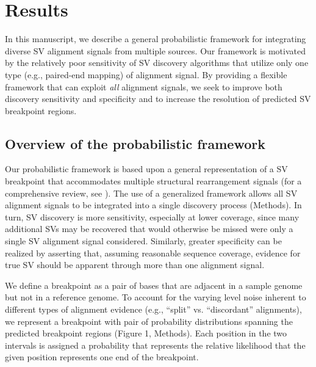 \documentclass[11pt]{article}
\begin{document}
\section{Results}

In this manuscript, we describe a general probabilistic framework for 
integrating diverse SV alignment signals from multiple sources. Our framework is
motivated by the relatively poor sensitivity of SV discovery algorithms
that utilize only one type (e.g., paired-end mapping) of alignment signal.
By providing a flexible framework that can exploit \emph{all} alignment signals,
we seek to improve both discovery sensitivity and specificity and to increase 
the resolution of predicted SV breakpoint regions.

\subsection{Overview of the probabilistic framework}

Our probabilistic framework is based upon a general representation of a SV 
breakpoint that accommodates multiple structural rearrangement signals (for a 
comprehensive review, see \cite{Alkan2011}). The use of a generalized framework
allows all SV alignment signals to be integrated into a single discovery
process (Methods). In turn, SV discovery is more sensitivity, 
especially at lower coverage, since many additional SVs may be recovered that 
would otherwise be missed were only a single SV alignment signal considered. 
Similarly, greater specificity can be realized by asserting that, assuming 
reasonable sequence coverage, evidence for true SV should be apparent through 
more than one alignment signal.

We define a breakpoint as a pair of bases that are adjacent in a sample genome 
but not in a reference genome.  To account for the varying level noise inherent 
to different types of alignment evidence (e.g., ``split'' vs. ``discordant'' 
alignments), we represent a breakpoint with pair of probability distributions
spanning the predicted breakpoint regions (Figure 1, Methods).  Each position 
in the two intervals is assigned a probability that represents the relative 
likelihood that the given position represents one end of the breakpoint. 
\end{document}
